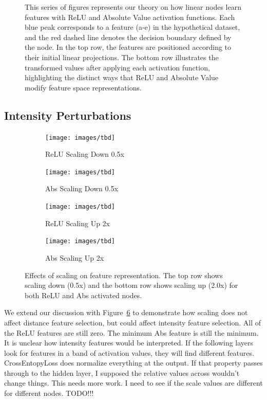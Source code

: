 \begin{figure}[t]
    \caption{This series of figures represents our theory on how linear nodes learn features with ReLU and Absolute Value activation functions. Each blue peak corresponds to a feature (a-e) in the hypothetical dataset, and the red dashed line denotes the decision boundary defined by the node. In the top row, the features are positioned according to their initial linear projections. The bottom row illustrates the transformed values after applying each activation function, highlighting the distinct ways that ReLU and Absolute Value modify feature space representations.}
    \label{fig:activation_demo}
\end{figure}

\subsection{Intensity Perturbations}

\begin{figure}[t]
    \centering

    \begin{subfigure}[b]{0.49\textwidth}
        \centering
        \texttt{[image: images/tbd]}
        \caption{ReLU Scaling Down 0.5x}
        \label{fig:relu_scale_down}
    \end{subfigure}
    \hfill
    \begin{subfigure}[b]{0.49\textwidth}
        \centering
        \texttt{[image: images/tbd]}
        \caption{Abs Scaling Down 0.5x}
        \label{fig:relu_scale_down}
    \end{subfigure}

    \begin{subfigure}[b]{0.49\textwidth}
    \centering
    \texttt{[image: images/tbd]}
    \caption{ReLU Scaling Up 2x}
    \label{fig:relu_scale_up}
    \end{subfigure}
    \hfill
    \begin{subfigure}[b]{0.49\textwidth}
    \centering
    \texttt{[image: images/tbd]}
    \caption{Abs Scaling Up 2x}
    \label{fig:abs_scale_up}
    \end{subfigure}

    \caption{Effects of scaling on feature representation. The top row shows scaling down (0.5x) and the bottom row shows scaling up (2.0x) for both ReLU and Abs activated nodes.}
    \label{fig:scaling_demo}
\end{figure}

We extend our discussion with Figure~\ref{fig:scaling_demo} to demonstrate how scaling does not affect distance feature selection, but could affect intensity feature selection. All of the ReLU features are still zero. The minimum Abs feature is still the minimum. It is unclear how intensity features would be interpreted. If the following layers look for features in a band of activation values, they will find different features. CrossEntopyLoss does normalize everything at the output. If that property passes through to the hidden layer, I supposed the relative values across wouldn't change things. This needs more work. I need to see if the scale values are different for different nodes. TODO!!!

